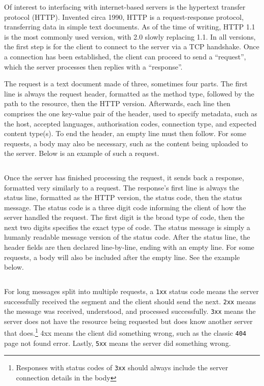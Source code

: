 \documentclass[11pt]{article}
\begin{document}
Of interest to interfacing with internet-based servers is the hypertext transfer protocol (HTTP). Invented circa 1990, HTTP is a request-response protocol, transferring data in simple text documents. As of the time of writing, HTTP 1.1 is the most commonly used version, with 2.0 slowly replacing 1.1. In all versions, the first step is for the client to connect to the server via a TCP handshake. Once a connection has been established, the client can proceed to send a ``request'', which the server processes then replies with a ``response''.

The request is a text document made of three, sometimes four parts. The first line is always the request header, formatted as the method type, followed by the path to the resource, then the HTTP version. Afterwards, each line then comprises the one key-value pair of the header, used to specify metadata, such as the host, accepted languages, authorisation codes, connection type, and expected content type(s). To end the header, an empty line must then follow. For some requests, a body may also be necessary, such as the content being uploaded to the server. Below is an example of such a request.

\vspace{0.5\baselineskip}

\inputminted[linenos=true]{html}{http_examples/post_request.html}

Once the server has finished processing the request, it sends back a response, formatted very similarly to a request. The response's first line is always the status line, formatted as the HTTP version, the status code, then the status message. The status code is a three digit code informing the client of how the server handled the request. The first digit is the broad type of code, then the next two digits specifies the exact type of code. The status message is simply a humanly readable message version of the status code. After the status line, the header fields are then declared line-by-line, ending with an empty line. For some requests, a body will also be included after the empty line. See the example below.

\vspace{0.5\baselineskip}

\inputminted[linenos=true]{html}{http_examples/get_response.html}

\begin{info}
For long messages split into multiple requests, a \texttt{1xx} status code means the server successfully received the segment and the client should send the next. \texttt{2xx} means the message was received, understood, and processed successfully. \texttt{3xx} means the server does not have the resource being requested but does know another server that does.\footnote{Responses with status codes of \texttt{3xx} should always include the server connection details in the body} 4xx means the client did something wrong, such as the classic \texttt{404} page not found error. Lastly, \texttt{5xx} means the server did something wrong.
\end{info}
\end{document}
